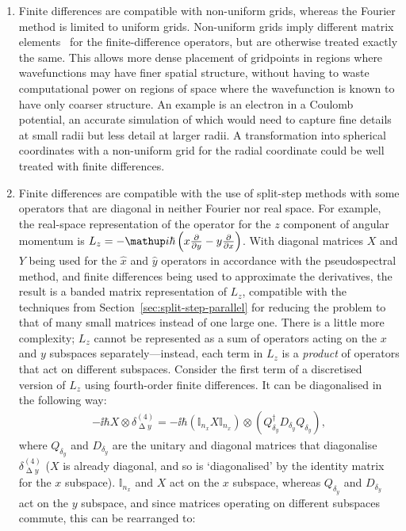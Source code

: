 \begin{enumerate}
    \item Finite differences are compatible with non-uniform grids, whereas the Fourier method is limited to uniform grids. Non-uniform grids imply different matrix elements~\cite{fornberg_generation_1988} for the finite-difference operators, but are otherwise treated exactly the same. This allows more dense placement of gridpoints in regions where wavefunctions may have finer spatial structure, without having to waste computational power on regions of space where the wavefunction is known to have only coarser structure. An example is an electron in a Coulomb potential, an accurate simulation of which would need to capture fine details at small radii but less detail at larger radii. A transformation into spherical coordinates with a non-uniform grid for the radial coordinate could be well treated with finite differences.
    \item Finite differences are compatible with the use of split-step methods with some operators that are diagonal in neither Fourier nor real space. For example, the real-space representation of the operator for the $z$ component of angular momentum is $L_z = -\ii\hbar\left(x\pdv{y} - y \pdv{x}\right)$. With diagonal matrices $X$ and $Y$ being used for the $\hat x$ and $\hat y$ operators in accordance with the pseudospectral method, and finite differences being used to approximate the derivatives, the result is a banded matrix representation of $L_z$, compatible with the techniques from Section~\ref{sec:split-step-parallel} for reducing the problem to that of many small matrices instead of one large one. There is a little more complexity; $L_z$ cannot be represented as a sum of operators acting on the $x$ and $y$ subspaces separately---instead, each term in $L_z$ is a \emph{product} of operators that act on different subspaces. Consider the first term of a discretised version of $L_z$ using fourth-order finite differences. It can be diagonalised in the following way:
    \begin{align}
        -\ii\hbar X \otimes \delta^{(4)}_{\upDelta y}
        = -\ii\hbar\left(\mathbb{I}_{n_x} X \mathbb{I}_{n_x}\right)
        \otimes \left(Q_{\delta_y}^\dagger D_{\delta_y}Q_{\delta_y}\right),
    \end{align}
    where $Q_{\delta_y}$ and $D_{\delta_y}$ are the unitary and diagonal matrices that diagonalise $\delta^{(4)}_{\upDelta y}$ ($X$ is already diagonal, and so is `diagonalised' by the identity matrix for the $x$ subspace). $\mathbb{I}_{n_x}$ and $X$ act on the $x$ subspace, whereas $Q_{\delta_y}$ and $D_{\delta_y}$ act on the $y$ subspace, and since matrices operating on different subspaces commute, this can be rearranged to:

\end{enumerate}
